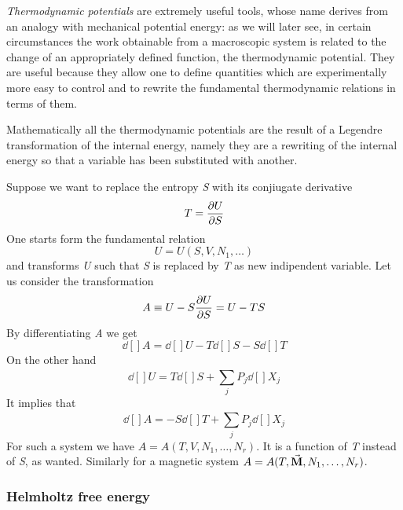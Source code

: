 \documentclass[../main/main.tex]{subfiles}
\begin{document}
\emph{Thermodynamic potentials} are extremely useful tools, whose name derives from an analogy with mechanical potential energy: as we will later see, in certain circumstances the work obtainable from a macroscopic system is related to the change of an appropriately defined function, the thermodynamic potential. They are useful because they allow one to define quantities which are experimentally more easy to control and to rewrite the fundamental thermodynamic relations in terms of them.

Mathematically all the thermodynamic potentials are the result of a Legendre transformation of the internal energy, namely they are a rewriting of the internal energy so that a variable has been substituted with another.

\begin{example}{}{}
Suppose we want to replace the entropy \emph{S} with its conjiugate derivative
\begin{equation*}
  T = \pdv{U}{S}
\end{equation*}
One starts form the fundamental relation
\begin{equation*}
  U=U(S,V,N_1,\dots)
\end{equation*}
and transforms \emph{U} such that \emph{S} is replaced by \emph{T} as new indipendent variable. Let us consider the transformation
\begin{equation*}
  A \equiv U - S \pdv{U}{S} = U- T S
\end{equation*}
By differentiating \emph{A} we get
\begin{equation*}
  \dd[]{A} = \dd[]{U} - T \dd[]{S}  - S \dd[]{T}
\end{equation*}
On the other hand
\begin{equation*}
  \dd[]{U} = T \dd[]{S} + \sum_{j}^{} P_j \dd[]{X_j}
\end{equation*}
It implies that
\begin{equation*}
  \dd[]{A} = - S \dd[]{T} + \sum_{j}^{} P_j \dd[]{X_j}
\end{equation*}
For such a system we have \( A=A(T,V,N_1,\dots,N_r) \). It is a function of \emph{T} instead of \emph{S}, as wanted.  Similarly for a magnetic system \( A=A(T,\va{M},N_1,\dots,N_r ) \).
\end{example}

\subsubsection{Helmholtz free energy}
\end{document}
